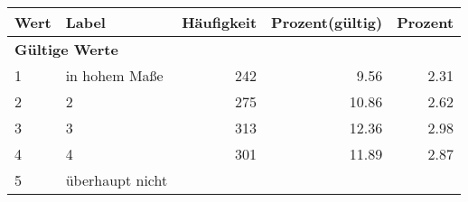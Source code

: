      \begin{longtable}{lXrrr}
     \toprule
     \textbf{Wert} & \textbf{Label} & \textbf{Häufigkeit} & \textbf{Prozent(gültig)} & \textbf{Prozent} \\
     \endhead
     \midrule
     \multicolumn{5}{l}{\textbf{Gültige Werte}}\\

     1 &
     \multicolumn{1}{X}{ in hohem Maße   } &


       \num{242} &
       \num[round-mode=places,round-precision=2]{9.56} &
         \num[round-mode=places,round-precision=2]{2.31} \\

     2 &
     \multicolumn{1}{X}{ 2   } &


       \num{275} &
       \num[round-mode=places,round-precision=2]{10.86} &
         \num[round-mode=places,round-precision=2]{2.62} \\

     3 &
     \multicolumn{1}{X}{ 3   } &


       \num{313} &
       \num[round-mode=places,round-precision=2]{12.36} &
         \num[round-mode=places,round-precision=2]{2.98} \\

     4 &
     \multicolumn{1}{X}{ 4   } &


       \num{301} &
       \num[round-mode=places,round-precision=2]{11.89} &
         \num[round-mode=places,round-precision=2]{2.87} \\

     5 &
     \multicolumn{1}{X}{ überhaupt nicht   } &



\end{longtable}
